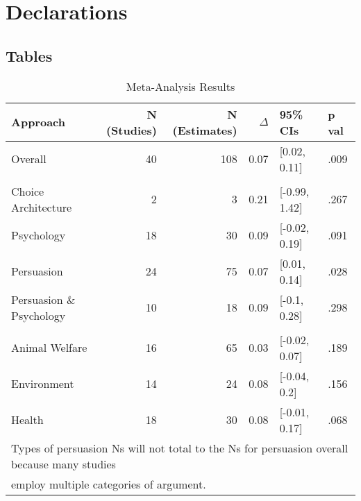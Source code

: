 \documentclass[sn-nature,referee,pdflatex]{sn-jnl}
\begin{document}
\section*{Declarations}\label{declarations}

\newpage

\subsection{Tables}\label{tables}

\begin{table}[!h]
\centering
\caption{\label{tab:table_one}Meta-Analysis Results}
\centering
\begin{tabular}[t]{lrrrll}
\toprule
Approach & N (Studies) & N (Estimates) & $\Delta$ & 95\% CIs & p val\\
\midrule
Overall & 40 & 108 & 0.07 & {}[0.02, 0.11] & .009\\
\addlinespace[0.5em]
\multicolumn{6}{l}{\textbf{Theory}}\\
\hspace{1em}Choice Architecture & 2 & 3 & 0.21 & {}[-0.99, 1.42] & .267\\
\hspace{1em}Psychology & 18 & 30 & 0.09 & {}[-0.02, 0.19] & .091\\
\hspace{1em}Persuasion & 24 & 75 & 0.07 & {}[0.01, 0.14] & .028\\
\hspace{1em}Persuasion \& Psychology & 10 & 18 & 0.09 & {}[-0.1, 0.28] & .298\\
\addlinespace[0.5em]
\multicolumn{6}{l}{\textbf{Type of Persuasion}}\\
\hspace{1em}Animal Welfare & 16 & 65 & 0.03 & {}[-0.02, 0.07] & .189\\
\hspace{1em}Environment & 14 & 24 & 0.08 & {}[-0.04, 0.2] & .156\\
\hspace{1em}Health & 18 & 30 & 0.08 & {}[-0.01, 0.17] & .068\\
\bottomrule
\multicolumn{6}{l}{\textsuperscript{} Types of persuasion Ns will not total to the Ns for persuasion overall because many studies}\\
\multicolumn{6}{l}{employ multiple categories of argument.}\\
\end{tabular}
\end{table}
\end{document}
